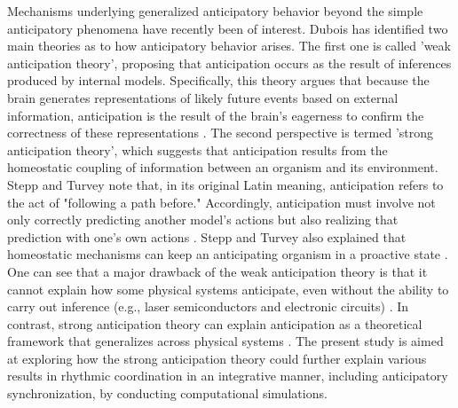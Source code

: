 \documentclass{report}
\begin{document}
Mechanisms underlying generalized anticipatory behavior beyond the simple anticipatory phenomena have recently been of interest. Dubois \cite{dubois2001incursive} has identified two main theories as to how anticipatory behavior arises. The first one is called 'weak anticipation theory', proposing that anticipation occurs as the result of inferences produced by internal models. Specifically, this theory argues that because the brain generates representations of likely future events based on external information, anticipation is the result of the brain's eagerness to confirm the correctness of these representations \cite{clark1998being, clark1999towards}. The second perspective is termed 'strong anticipation theory', which suggests that anticipation results from the homeostatic coupling of information between an organism and its environment. Stepp and Turvey \cite{stepp2010strong} note that, in its original Latin meaning, anticipation refers to the act of "following a path before." Accordingly, anticipation must involve not only correctly predicting another model's actions but also realizing that prediction with one's own actions \cite{stepp2010strong}. Stepp and Turvey also explained that homeostatic mechanisms can keep an anticipating organism in a proactive state \cite{stepp2010strong}. One can see that a major drawback of the weak anticipation theory is that it cannot explain how some physical systems anticipate, even without the ability to carry out inference (e.g., laser semiconductors and electronic circuits) \cite{washburn2015harmony, kelso1995dynamic}. In contrast, strong anticipation theory can explain anticipation as a theoretical framework that generalizes across physical systems \cite{stepp2010strong}. The present study is aimed at exploring how the strong anticipation theory could further explain various results in rhythmic coordination in an integrative manner, including anticipatory synchronization, by conducting computational simulations.
\end{document}
